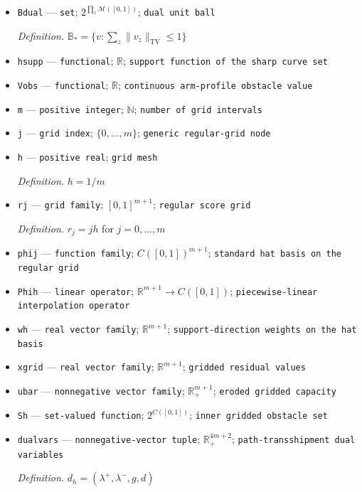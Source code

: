 \documentclass{article}
\begin{document}
\begin{itemize}
  \item \texttt{Bdual} --- \texttt{set}; \(2^{\prod_z\mathcal M([0,1])}\); \texttt{dual unit ball}
  \par\smallskip\noindent\emph{Definition.} \(\mathbb B_*=\{v:\sum_z\|v_z\|_{\mathrm{TV}}\le1\}\)
  \item \texttt{hsupp} --- \texttt{functional}; \(\mathbb R\); \texttt{support function of the sharp curve set}
  \item \texttt{Vobs} --- \texttt{functional}; \(\mathbb R\); \texttt{continuous arm-\allowbreak{}profile obstacle value}
  \item \texttt{m} --- \texttt{positive integer}; \(\mathbb N\); \texttt{number of grid intervals}
  \item \texttt{j} --- \texttt{grid index}; \(\{0,\ldots,m\}\); \texttt{generic regular-\allowbreak{}grid node}
  \item \texttt{h} --- \texttt{positive real}; \texttt{grid mesh}
  \par\smallskip\noindent\emph{Definition.} \(h=1/m\)
  \item \texttt{rj} --- \texttt{grid family}; \([0,1]^{m+1}\); \texttt{regular score grid}
  \par\smallskip\noindent\emph{Definition.} \(r_j=jh\) for \(j=0,\ldots,m\)
  \item \texttt{phij} --- \texttt{function family}; \(C([0,1])^{m+1}\); \texttt{standard hat basis on the regular grid}
  \item \texttt{Phih} --- \texttt{linear operator}; \(\mathbb R^{m+1}\to C([0,1])\); \texttt{piecewise-\allowbreak{}linear interpolation operator}
  \item \texttt{wh} --- \texttt{real vector family}; \(\mathbb R^{m+1}\); \texttt{support-\allowbreak{}direction weights on the hat basis}
  \item \texttt{xgrid} --- \texttt{real vector family}; \(\mathbb R^{m+1}\); \texttt{gridded residual values}
  \item \texttt{ubar} --- \texttt{nonnegative vector family}; \(\mathbb R_+^{m+1}\); \texttt{eroded gridded capacity}
  \item \texttt{Sh} --- \texttt{set-\allowbreak{}valued function}; \(2^{C([0,1])}\); \texttt{inner gridded obstacle set}
  \item \texttt{dualvars} --- \texttt{nonnegative-\allowbreak{}vector tuple}; \(\mathbb R_+^{4m+2}\); \texttt{path-\allowbreak{}transshipment dual variables}
  \par\smallskip\noindent\emph{Definition.} \(d_h=(\lambda^+,\lambda^-,g,d)\)

\end{itemize}
\end{document}

